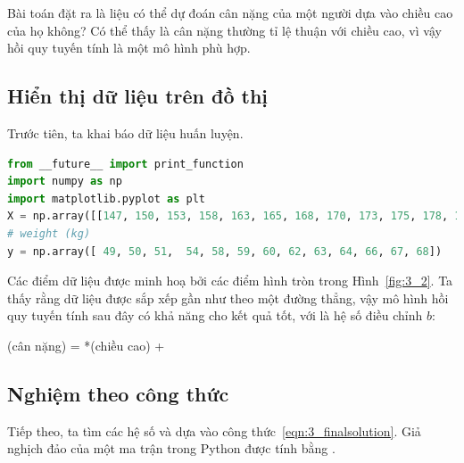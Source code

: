 Bài toán đặt ra là liệu có thể dự đoán cân nặng của một người dựa vào chiều cao
của họ không? Có thể thấy là cân nặng thường tỉ lệ thuận với chiều cao, vì vậy hồi quy tuyến tính là một mô hình phù hợp.



\subsection{Hiển thị dữ liệu trên đồ thị}
Trước tiên, ta khai báo dữ liệu huấn luyện.
\begin{lstlisting}[language=Python]
from __future__ import print_function
import numpy as np
import matplotlib.pyplot as plt
X = np.array([[147, 150, 153, 158, 163, 165, 168, 170, 173, 175, 178, 180, 183]]).T  # height (cm), input data, each row is a data point
# weight (kg)
y = np.array([ 49, 50, 51,  54, 58, 59, 60, 62, 63, 64, 66, 67, 68])
\end{lstlisting}



Các điểm dữ liệu được minh hoạ bởi các điểm hình tròn trong Hình~\ref{fig:3_2}.
Ta thấy rằng dữ liệu được sắp xếp gần như theo một đường thẳng, vậy mô hình hồi
quy tuyến tính sau đây có khả năng cho kết quả tốt, với  là
hệ số điều chỉnh $b$:
\begin{center}
(cân nặng) = *(chiều cao) + 
\end{center}


\subsection{Nghiệm theo công thức}

Tiếp theo, ta tìm các hệ số  và
 dựa vào công thức~\eqref{eqn:3_finalsolution}. Giả
nghịch đảo của một ma trận  trong Python được tính bằng
.%

